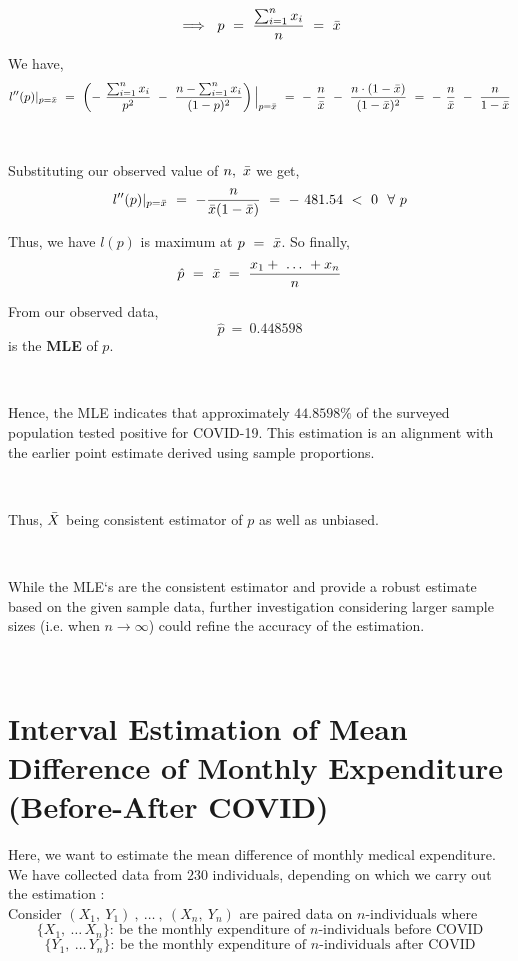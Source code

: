 $$\implies \ p \ = \ \frac{\sum_{i = 1}^{n} x_{i}}{n} \ = \ \Bar{x}$$

We have,
$$l^{\prime \prime}(p) \vert_{p = \Bar{x}} \ = \ \left(- \ \frac{\sum_{i = 1}^{n} x_{i}}{p^{2}} \ - \ \frac{n - \sum_{i = 1}^{n} x_{i}}{(1 - p)^{2}}\right) \Big|_{p = \bar{x}} \ = \ - \ \frac{n}{\Bar{x}} \ - \ \frac{n \cdot (1 - \Bar{x})}{(1 - \Bar{x})^{2}} \ = \ - \ \frac{n}{\Bar{x}} \ - \ \frac{n}{1 - \Bar{x}}$$

\ 

Substituting our observed value of $n, \ \Bar{x}$ we get,
$$l^{\prime \prime}(p) \vert_{p = \Bar{x}} \ = \ - \frac{n}{\Bar{x}(1 - \Bar{x})} \ = \ - \ 481.54 \ < \ 0 \ \ \forall \ p $$

Thus, we have $l(p)$ is maximum at $p \ = \ \Bar{x}$. So finally,
$$\hat{p} \ = \ \Bar{x} \ = \ \frac{x_{1} + \ \ldots \ + x_{n}}{n}$$

From our observed data,
$$\hat{p} \ = \ 0.448598$$ 
is the \textbf{MLE} of $p$.

\ 

Hence, the MLE indicates that approximately $44.8598 \%$ of the surveyed \\ population tested positive for COVID-19. This estimation is an alignment with the earlier point estimate derived using sample proportions.

\

Thus, $\Bar{X}$ being consistent estimator of $p$ as well as unbiased.

\ 

While the MLE`s are the consistent estimator and provide a robust estimate based on the given sample data, further investigation considering larger sample sizes (i.e. when $n \to \infty$) could refine the accuracy of the estimation.

\ 

\section{Interval Estimation of Mean Difference of Monthly Expenditure \\ (Before-After COVID)}

Here, we want to estimate the mean difference of monthly medical expenditure. We have collected data from $230$ individuals, depending on which we carry out the estimation : \\

Consider $(X_{1}, \ Y_{1}) \ , \ \ldots \ ,  \ (X_{n}, \ Y_{n})$ are paired data on $n$-individuals where
$$\{ X_{1}, \ \ldots \, X_{n}\} : \ \text{be the monthly expenditure of $n$-individuals before COVID}$$
$$\{ Y_{1}, \ \ldots \, Y_{n}\} : \ \text{be the monthly expenditure of $n$-individuals after COVID}$$

